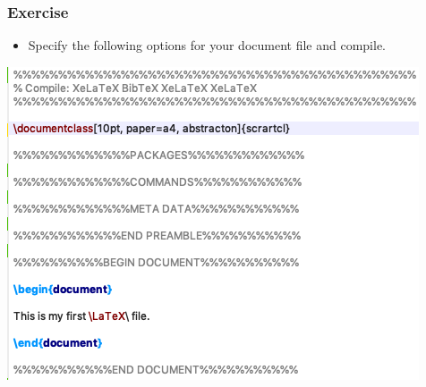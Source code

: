 \begin{frame}[fragile]
\frametitle{Exercise}

\begin{itemize}
	\item Specify the following options for your document   file and compile.
\end{itemize}

\vspace{.25cm}

\centering
\includegraphics[scale=0.45]{../../texfiles-beamer/tex-material/WissArb-latex/xelatexTest2tex}

\end{frame}


%
%
%


%
%
%
%
%


